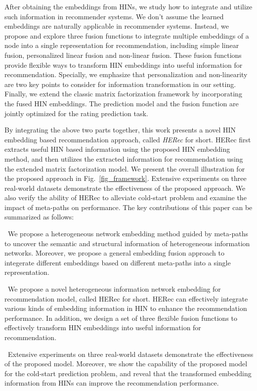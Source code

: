 After obtaining the embeddings from HINs, we study how to integrate and utilize such information in recommender systems.
We don't assume the learned embeddings are naturally applicable in recommender systems. Instead, we propose and explore three fusion functions to integrate multiple embeddings of a node into a single representation for recommendation, including simple linear fusion, personalized linear fusion and non-linear fusion.
These fusion functions provide flexible ways to transform HIN embeddings into useful information for recommendation.
Specially, we emphasize that personalization and non-linearity are two key points to consider for information transformation in our setting.
Finally, we extend the classic matrix factorization framework by incorporating the fused HIN embeddings.
The prediction model and the fusion function are jointly optimized for the rating prediction task.

By integrating the above two parts together, this work presents a novel HIN embedding based recommendation approach, called \emph{HERec} for short.
HERec first extracts useful HIN based information using the proposed HIN embedding method,
and then utilizes the extracted information for recommendation using the extended matrix factorization model.
We present the overall illustration for the proposed approach in Fig.~\ref{fig_framework}.
Extensive experiments on three real-world datasets demonstrate the effectiveness of the proposed approach. We also  verify the ability of HERec to alleviate cold-start problem and examine the impact of meta-paths on performance. The key contributions of this paper can be summarized as follows:


\textbullet ~We propose a heterogeneous network embedding method guided by meta-paths to uncover the semantic and structural information of heterogeneous information networks. Moreover, we propose a general embedding fusion approach to integerate different
embeddings based on different meta-paths into a single representation.

\textbullet ~We propose a novel heterogeneous information network embedding for recommendation model, called HERec for short. HERec can effectively integrate various kinds of embedding information in HIN to enhance the recommendation performance. In addition, we design a set of three flexible fusion functions to effectively transform HIN embeddings into useful information for recommendation.

\textbullet ~Extensive experiments on three real-world datasets demonstrate the effectiveness of the proposed model. Moreover, we show the capability of the proposed model for the cold-start prediction problem, and reveal that the transformed embedding information from HINs can improve the recommendation performance.

